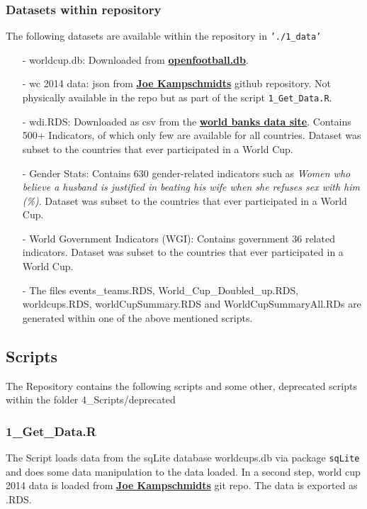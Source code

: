 \documentclass[10pt,a4paper,notitlepage,onecolumn]{article}
\begin{document}
\begin{raggedright}
\subsubsection*{Datasets within repository}
The following datasets are available within the repository in \texttt{'./1\_data'} \\
\begin{itemize}
\item[-] worldcup.db: Downloaded from \href{https://github.com/openfootball}{\textbf{openfootball.db}}. \\
\item[-] wc 2014 data: json from \href{https://github.com/jokecamp/FootballData}{\textbf{Joe Kampschmidts}} github repository. Not physically available in the repo but as part of the script \texttt{1\_Get\_Data.R}. \\
\item[-] wdi.RDS: Downloaded as csv from the \href{https://data.worldbank.org/}{\textbf{world banks data site}}. Contains 500+ Indicators, of which only few are available for all countries. Dataset was subset to the countries that ever participated in a World Cup. \\
\item[-] Gender Stats: Contains 630 gender-related indicators such as \textit{Women who believe a husband is justified in beating his wife when she refuses sex with him (\%)}. Dataset was subset to the countries that ever participated in a World Cup. 
\item[-] World Government Indicators (WGI): Contains government 36 related indicators. Dataset was subset to the countries that ever participated in a World Cup.  \\
\item[-] The files events\_teams.RDS,  World\_Cup\_Doubled\_up.RDS, worldcups.RDS, worldCupSummary.RDS and WorldCupSummaryAll.RDs are generated within one of the above mentioned scripts. 
\end{itemize} 


\subsection*{Scripts}
The Repository contains the following scripts and some other, deprecated scripts within the folder 4\_Scripts/deprecated
\subsubsection*{1\_Get\_Data.R}
The Script loads data from the sqLite database worldcups.db via package \texttt{sqLite} and does some data manipulation to the data loaded. In a second step, world cup 2014 data is loaded from \href{https://github.com/jokecamp/FootballData}{\textbf{Joe Kampschmidts}} git repo. The data is exported as .RDS. 

\end{raggedright}
\end{document}
